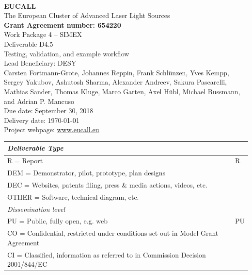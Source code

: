 \documentclass[10pt]{scrartcl}
\begin{document}
\makeatletter
\begin{titlepage}
\thispagestyle{scrheadings}
\begin{center}
$~$\\
\vspace{0cm}
{\Large\textbf{EUCALL}\\[2ex]
The European Cluster of Advanced Laser Light Sources}\\[4ex]
%
{\small\textbf{Grant Agreement number: 654220}}\\[6ex]
%
Work Package 4 -- SIMEX\\[3ex]
%
Deliverable D4.5\\
%
Testing, validation, and example workflow\\[4ex]
%
Lead Beneficiary: DESY\\[4ex]
%
Carsten Fortmann-Grote,
Johannes Reppin,
Frank Schl\"unzen,
Yves Kempp,
Sergey Yakubov,
Ashutosh Sharma,
Alexander Andreev,
Sakura Pascarelli,
Mathias Sander,
Thomas Kluge,
Marco Garten,
Axel H\"ubl,
Michael Bussmann,
and
Adrian P. Mancuso\\[4ex]
%
Due date: September 30, 2018\\
Delivery date: \today \\[4ex]
%
Project webpage: \url{www.eucall.eu}\\[6ex]
%
{%
\small
\begin{tabular}{|l|l|}
  \hline
  \multicolumn{2}{|l|}{ \textit{Deliverable Type} } \\
  \hline
  R = Report\hfill & R\\
  DEM = Demonstrator, pilot, prototype, plan designs & \\
  DEC = Websites, patents filing, press \& media actions, videos, etc. & \\
  OTHER = Software, technical diagram, etc. & \\
  \hline
  \multicolumn{2}{|l|}{\textit{Dissemination level}} \\
  \hline
  PU = Public, fully open, e.g. web & PU \\
  CO = Confidential, restricted under conditions set out in Model Grant
  Agreement\hspace*{17ex}\  & \\
  CI = Classified, information as referred to in Commission Decision 2001/844/EC
  & \\
  \hline
\end{tabular}
}

\end{center}
%
{}
\normalfont
\end{titlepage}
\makeatother
\end{document}
